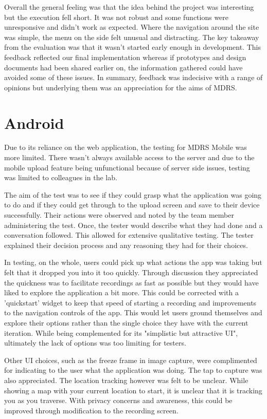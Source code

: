 \documentclass{l3proj}
\begin{document}
Overall the general feeling was that the idea behind the project was interesting but the execution fell short. It was not robust and some functions were unresponsive and didn't work as expected. Where the navigation around the site was simple, the menu on the side felt unusual and distracting. The key takeaway from the evaluation was that it wasn't started early enough in development. This feedback reflected our final implementation whereas if prototypes and design documents had been shared earlier on, the information gathered could have avoided some of these issues. In summary, feedback was indecisive with a range of opinions but underlying them was an appreciation for the aims of MDRS.

\section{Android}		Due to its reliance on the web application, the testing for MDRS Mobile was more limited. There wasn't always available access to the server and due to the mobile upload feature being unfunctional because of server side issues, testing was limited to colleagues in the lab.

The aim of the test was to see if they could grasp what the application was going to do and if they could get through to the upload screen and save to their device successfully. Their actions were observed and noted by the team member administering the test. Once, the tester would describe what they had done and a conversation followed. This allowed for extensive qualitative testing. The tester explained their decision process and any reasoning they had for their choices.

In testing, on the whole, users could pick up what actions the app was taking but felt that it dropped you into it too quickly. Through discussion they appreciated the quickness was to facilitate recordings as fast as possible but they would have liked to explore the application a bit more. This could be corrected with a 'quickstart' widget to keep that speed of starting a recording and improvements to the navigation controls of the app. This would let users ground themselves and explore their options rather than the single choice they have with the current iteration. While being complemented for its "simplistic but attractive UI", ultimately the lack of options was too limiting for testers.

Other UI choices, such as the freeze frame in image capture, were complimented for indicating to the user what the application was doing. The tap to capture was also appreciated. The location tracking however was felt to be unclear. While showing a map with your current location to start, it is unclear that it is tracking you as you traverse. With privacy concerns and awareness, this could be improved through modification to the recording screen.
\end{document}

